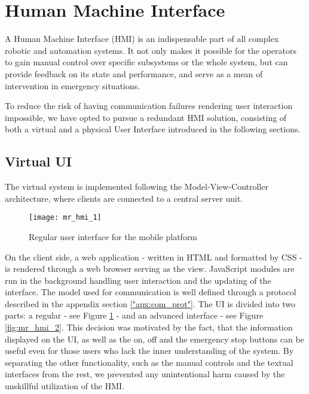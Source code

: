 \section{Human Machine Interface} %
\label{sec:mr_human_machine_interface}

A Human Machine Interface (HMI) is an indispensable part of all complex robotic and automation systems. It not only makes it possible for the operators to gain manual control over specific subsystems or the whole system, but can provide feedback on its state and performance, and serve as a mean of intervention in emergency situations.

To reduce the risk of having communication failures rendering user interaction impossible, we have opted to pursue a redundant HMI solution, consisting of both a virtual and a physical User Interface introduced in the following sections.

	\subsection{Virtual UI} %
	\label{sub:mr_web}
	
	The virtual system is implemented following the Model-View-Controller architecture, where clients are connected to a central server unit. 
	
	\begin{figure}[H]
		\centering
	    \texttt{[image: mr\_hmi\_1]}
	    \caption{Regular user interface for the mobile platform}
		\label{fig:mr_hmi_1}
	\end{figure}
	
	On the client side, a web application - written in HTML\cite{html} and formatted by CSS\cite{css} - is rendered through a web browser serving as the view. JavaScript\cite{javascript} modules are run in the background handling user interaction and the updating of the interface. The model used for communication is well defined through a protocol described in the appendix section \ref{"apx:com_prot"}. The UI is divided into two parts: a regular - see Figure \ref{fig:mr_hmi_1} - and an advanced interface - see Figure \ref{fig:mr_hmi_2}. This decision was motivated by the fact, that the information displayed on the UI, as well as the on, off and the emergency stop buttons can be useful even for those users who lack the inner understanding of the system. By separating the other functionality, such as the manual controls and the textual interfaces from the rest, we prevented any unintentional harm caused by the unskillful utilization of the HMI.
	
